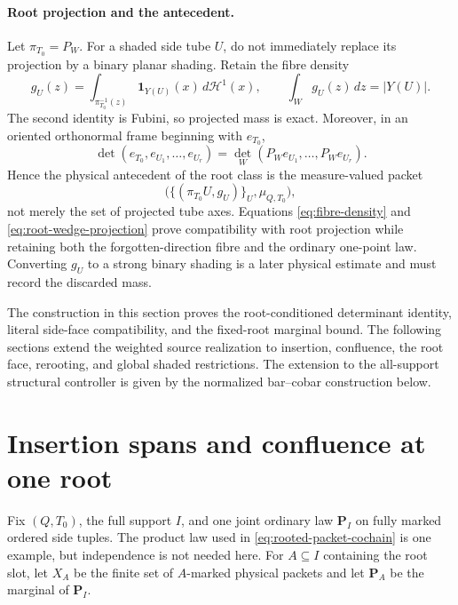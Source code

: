 \documentclass[11pt]{article}
\begin{document}
\paragraph{Root projection and the antecedent.}
Let \(\pi_{T_0}=P_W\).  For a shaded side tube \(U\), do not immediately replace
its projection by a binary planar shading.  Retain the fibre density
\begin{equation}\label{eq:fibre-density}
 g_U(z)=\int_{\pi_{T_0}^{-1}(z)}\mathbf 1_{Y(U)}(x)\,
           d\mathcal H^1(x),
 \qquad
 \int_W g_U(z)\,dz=|Y(U)|.
\end{equation}
The second identity is Fubini, so projected mass is exact.  Moreover, in an
oriented orthonormal frame beginning with \(e_{T_0}\),
\begin{equation}\label{eq:root-wedge-projection}
 \det(e_{T_0},e_{U_1},\ldots,e_{U_r})
 =\det_W(P_W e_{U_1},\ldots,P_W e_{U_r}).
\end{equation}
Hence the physical antecedent of the root class is the measure-valued packet
\[
 \bigl(\{(\pi_{T_0}U,g_U)\}_U,\mu_{Q,T_0}\bigr),
\]
not merely the set of projected tube axes.  Equations
\eqref{eq:fibre-density} and \eqref{eq:root-wedge-projection} prove compatibility
with root projection while retaining both the forgotten-direction fibre and
the ordinary one-point law.  Converting \(g_U\) to a strong binary shading is a
later physical estimate and must record the discarded mass.

The construction in this section proves the root-conditioned determinant
identity, literal side-face compatibility, and the fixed-root marginal bound.
The following sections extend the weighted source realization to insertion,
confluence, the root face, rerooting, and global shaded restrictions.  The
extension to the all-support structural controller is given by the normalized
bar--cobar construction below.

\section{Insertion spans and confluence at one root}

Fix \((Q,T_0)\), the full support \(I\), and one joint ordinary law
\(\mathbf P_I\) on fully marked ordered side tuples.  The product law used in
\eqref{eq:rooted-packet-cochain} is one example, but independence is not needed
here.  For \(A\subseteq I\) containing the root slot, let \(X_A\) be the finite
set of \(A\)-marked physical packets and let \(\mathbf P_A\) be the marginal of
\(\mathbf P_I\).
\end{document}
